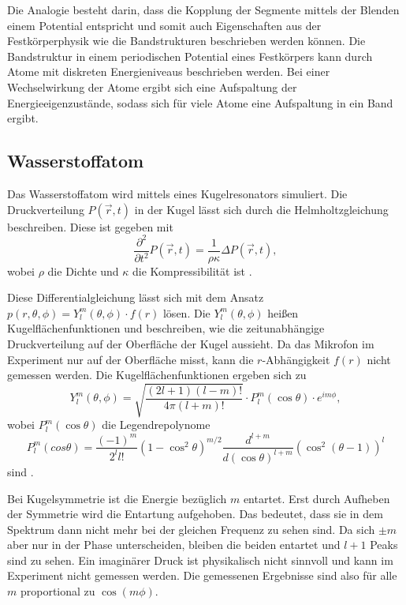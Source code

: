 Die Analogie besteht darin, dass die Kopplung der Segmente mittels der Blenden einem Potential entspricht und somit auch Eigenschaften aus der Festkörperphysik wie die Bandstrukturen beschrieben werden können. 
Die Bandstruktur in einem periodischen Potential eines Festkörpers kann durch Atome mit diskreten Energieniveaus beschrieben werden. Bei einer Wechselwirkung der Atome ergibt sich eine Aufspaltung der Energieeigenzustände, sodass sich für viele Atome eine Aufspaltung in ein Band ergibt.


\subsection{Wasserstoffatom}
\label{sec:Wasserstoff}
Das Wasserstoffatom wird mittels eines Kugelresonators simuliert. Die Druckverteilung $P(\vec r,t)$ in der Kugel lässt sich durch die Helmholtzgleichung beschreiben. 
Diese ist gegeben mit 
\begin{equation*}
    \frac{\partial^2}{\partial t^2} P(\vec r,t) = \frac{1}{\rho\kappa} \Delta P(\vec r,t),
\end{equation*}
wobei $\rho$ die Dichte und $\kappa$ die Kompressibilität ist \cite{QM1}. 

Diese Differentialgleichung lässt sich mit dem Ansatz $p(r, \theta, \phi) = Y^m_l(\theta, \phi) \cdot f(r)$ lösen.
Die $Y^m_l(\theta, \phi)$ heißen Kugelflächenfunktionen und beschreiben, wie die zeitunabhängige Druckverteilung auf der Oberfläche der Kugel aussieht. 
Da das Mikrofon im Experiment nur auf der Oberfläche misst, kann die $r$-Abhängigkeit $f(r)$ nicht gemessen werden. 
Die Kugelflächenfunktionen ergeben sich zu 
\begin{equation*}
    Y^m_l (\theta, \phi) = \sqrt{\frac{(2l+1)(l-m)!}{4\pi(l+m)!}} \cdot P^m_l(\cos \theta) \cdot e^{i m \phi},
\end{equation*}
wobei $P^m_l(\cos \theta)$ die Legendrepolynome 
\begin{equation*}
P^m_l(cos \theta) = \frac{(-1)^m}{2^l l!} (1- \cos^2 \theta)^{m/2} \frac{d^{l+m}}{d(\cos \theta)^{l+m}} (\cos^2 (\theta -1))^l
\end{equation*}
sind \cite{QM1}.

Bei Kugelsymmetrie ist die Energie bezüglich $m$ entartet. 
Erst durch Aufheben der Symmetrie wird die Entartung aufgehoben.  
Das bedeutet, dass sie in dem Spektrum dann nicht mehr bei der gleichen Frequenz zu sehen sind. Da sich $\pm m$ aber nur in der Phase unterscheiden, bleiben die beiden entartet und $l+1$ Peaks sind zu sehen. 
Ein imaginärer Druck ist physikalisch nicht sinnvoll und kann im Experiment nicht gemessen werden. Die gemessenen Ergebnisse sind also für alle $m$ proportional zu $\cos(m\phi)$. 

